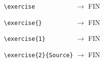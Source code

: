 \documentclass[10pt,a4paper]{article}
\begin{document}
\verb+\exercise           + $\rightarrow$ \exercise FIN

\verb+\exercise{}         + $\rightarrow$ \exercise{} FIN

\verb+\exercise{1}        + $\rightarrow$  FIN

\verb+\exercise{2}{Source}+ $\rightarrow$  FIN
\end{document}
